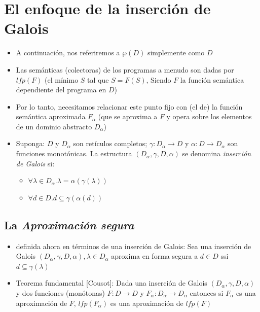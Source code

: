\documentclass[11pt]{article}
\begin{document}
\section*{El enfoque de la inserción de Galois}
\label{sec:orgb92d3d8}
\begin{itemize}
\item A continuación, nos referiremos a \(\wp(D)\) simplemente como \(D\)
\item Las semánticas (colectoras) de los programas a menudo son dadas por
\(lfp(F)\) (el mínimo \(S\) tal que \(S = F(S)\), Siendo \(F\) la función
semántica dependiente del programa en \(D\))
\item Por lo tanto, necesitamos relacionar este punto fijo con (el de) la
función semántica aproximada \(F_\alpha\) (que se aproxima a \(F\) y
opera sobre los elementos de un dominio abstracto \(D_\alpha\))
\item Suponga: \(D\) y \(D_\alpha\) son retículos completos; \(\gamma :
  D_\alpha \rightarrow D\) y \(\alpha : D \rightarrow D_\alpha\) son
funciones monotónicas. La estructura \((D_\alpha, \gamma, D, \alpha)\)
se denomina \emph{inserción de Galois} si:
\begin{itemize}
\item \(\forall \lambda \in D_\alpha . \lambda = \alpha(\gamma(\lambda))\)
\item \(\forall d \in D . d \subseteq \gamma(\alpha(d))\)
\end{itemize}
\end{itemize}
\subsection*{La \emph{Aproximación segura}}
\label{sec:org64df985}
\begin{itemize}
\item definida ahora en términos de una
inserción de Galois: Sea una inserción de Galois \((D_\alpha,
  \gamma,D, \alpha), \lambda \in D_\alpha\) aproxima en forma segura a
\(d \in D\)  ssi \(d \subseteq \gamma(\lambda)\)
\item Teorema fundamental [Cousot]: Dada una inserción de Galois
\((D_\alpha, \gamma, D, \alpha)\) y dos  funciones (monótonas) \(F: D
  \rightarrow D\) y \(F_\alpha: D_\alpha \rightarrow D_\alpha\) entonces
si \(F_\alpha\) es una aproximación de \(F\), \(lfp(F_\alpha)\) es una
aproximación de \(lfp(F)\)
\end{itemize}
\end{document}
